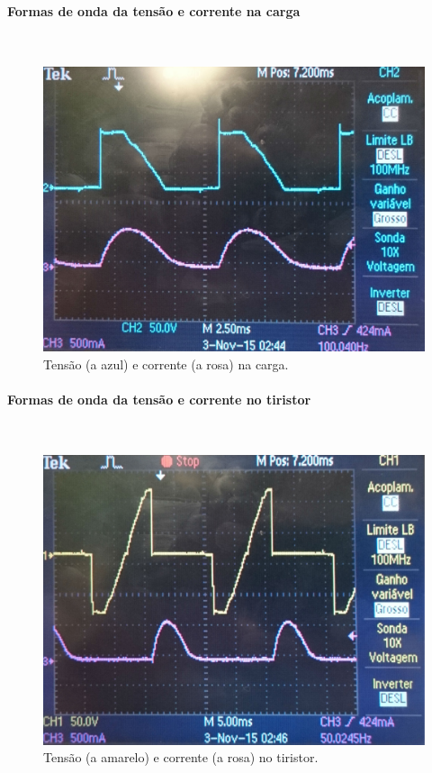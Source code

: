 \documentclass[a4paper,11pt]{article}
\numberwithin{equation}{section}
\begin{document}
\paragraph{Formas de onda da tensão e corrente na carga} \mbox{}\

\begin{figure}[H]
	\centering
	\includegraphics[keepaspectratio=true, scale=0.13]{img/DSC_0191}
	\caption{Tensão (a azul) e corrente (a rosa) na carga.}
	\label{fig:tccargasemi}
	\vspace{-0.8em}
\end{figure}

\paragraph{Formas de onda da tensão e corrente no tiristor} \mbox{}\

\begin{figure}[H]
	\centering
	\includegraphics[keepaspectratio=true, scale=0.12]{img/DSC_0192}
	\caption{Tensão (a amarelo) e corrente (a rosa) no tiristor.}
	\label{fig:tctiristorsemi}
	\vspace{-0.8em}
\end{figure}
\end{document}
